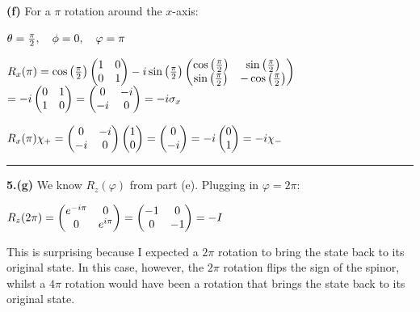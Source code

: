 \documentclass[14pt]{extarticle}
\makeatletter
\newenvironment{lefteqs}{%
    \begin{flushleft}%
    \renewcommand{\arraystretch}{1.3}%
    $\begin{array}{@{}l@{}}%
}{%
    \end{array}$%
    \end{flushleft}%
}
\makeatother
\begin{document}
\textbf{(f)} \quad For a $\pi$ rotation around the $x$-axis:
\begin{lefteqs}
    \theta = \frac{\pi}{2}, \quad \phi = 0, \quad \varphi = \pi
\end{lefteqs}
\begin{lefteqs}
    R_x(\pi) = \cos\left(\frac{\pi}{2}\right) \begin{pmatrix} 1 & 0 \\ 0 & 1 \end{pmatrix}
    - i \sin\left(\frac{\pi}{2}\right) \begin{pmatrix} \cos\left(\frac{\pi}{2}\right) & \sin\left(\frac{\pi}{2}\right) \\ \sin\left(\frac{\pi}{2}\right) & -\cos\left(\frac{\pi}{2}\right) \end{pmatrix} \\
    = -i \begin{pmatrix} 0 & 1 \\ 1 & 0 \end{pmatrix}
    = \begin{pmatrix} 0 & -i \\ -i & 0 \end{pmatrix} = -i \sigma_x
\end{lefteqs}
\begin{lefteqs}
    R_x(\pi) \chi_+ = \begin{pmatrix} 0 & -i \\ -i & 0 \end{pmatrix} \begin{pmatrix} 1 \\ 0 \end{pmatrix}
    = \begin{pmatrix} 0 \\ -i \end{pmatrix} = -i \begin{pmatrix} 0 \\ 1 \end{pmatrix} = -i \chi_-
\end{lefteqs}

\hrule
\vspace{2em}

\textbf{5.(g)} \quad We know $R_z(\varphi)$ from part (e). Plugging in $\varphi = 2\pi$:
\begin{lefteqs}
    R_z(2\pi) = \begin{pmatrix} e^{-i\pi} & 0 \\ 0 & e^{i\pi} \end{pmatrix}
    = \begin{pmatrix} -1 & 0 \\ 0 & -1 \end{pmatrix} = -I
\end{lefteqs}
This is surprising because I expected a $2\pi$ rotation to bring the state back to its original state.
In this case, however, the $2\pi$ rotation flips the sign of the spinor, whilst a $4\pi$ rotation would have been a rotation that brings the state back to its original state.
    
\end{document}
